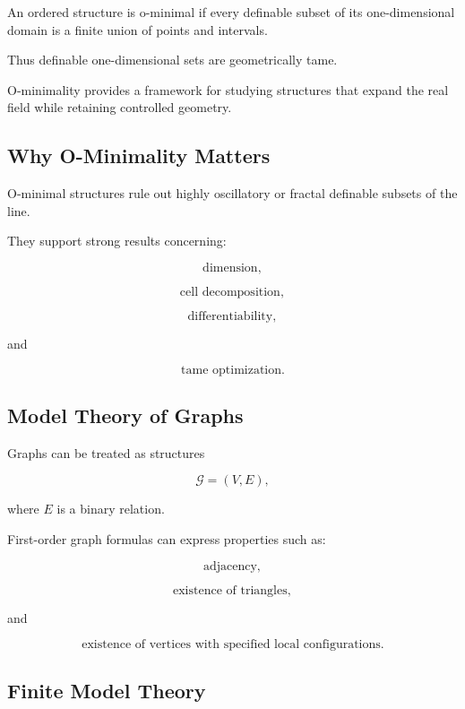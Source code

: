 An ordered structure is o-minimal if every definable subset of its
one-dimensional domain is a finite union of points and intervals.

Thus definable one-dimensional sets are geometrically tame.

O-minimality provides a framework for studying structures that expand the
real field while retaining controlled geometry.

\subsection{Why O-Minimality Matters}
\label{subsec:why-o-minimality-matters}

O-minimal structures rule out highly oscillatory or fractal definable
subsets of the line.

They support strong results concerning:

\[
\boxed{
\text{dimension},
}
\]

\[
\boxed{
\text{cell decomposition},
}
\]

\[
\boxed{
\text{differentiability},
}
\]

and

\[
\boxed{
\text{tame optimization}.
}
\]

\subsection{Model Theory of Graphs}
\label{subsec:model-theory-graphs}

Graphs can be treated as structures

\[
\boxed{
\mathcal{G}
=
(V,E),
}
\]

where \(E\) is a binary relation.

First-order graph formulas can express properties such as:

\[
\boxed{
\text{adjacency},
}
\]

\[
\boxed{
\text{existence of triangles},
}
\]

and

\[
\boxed{
\text{existence of vertices with specified local configurations}.
}
\]

\subsection{Finite Model Theory}
\label{subsec:finite-model-theory}

